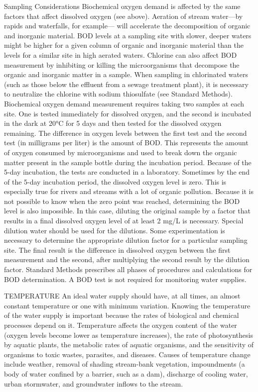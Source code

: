 \documentclass{article}
\begin{document}
Sampling Considerations Biochemical oxygen demand is affected by the
same factors that affect dissolved oxygen (see above). Aeration of
stream water---by rapids and waterfalls, for example--- will accelerate
the decomposition of organic and inorganic material. BOD levels at a
sampling site with slower, deeper waters might be higher for a given
column of organic and inorganic material than the levels for a similar
site in high aerated waters. Chlorine can also affect BOD measurement by
inhibiting or killing the microorganisms that decompose the organic and
inorganic matter in a sample. When sampling in chlorinated waters (such
as those below the effluent from a sewage treatment plant), it is
necessary to neutralize the chlorine with sodium thiosulfate (see
Standard Methods). Biochemical oxygen demand measurement requires taking
two samples at each site. One is tested immediately for dissolved
oxygen, and the second is incubated in the dark at 20°C for 5 days and
then tested for the dissolved oxygen remaining. The difference in oxygen
levels between the first test and the second test (in milligrams per
liter) is the amount of BOD. This represents the amount of oxygen
consumed by microorganisms and used to break down the organic matter
present in the sample bottle during the incubation period. Because of
the 5-day incubation, the tests are conducted in a laboratory. Sometimes
by the end of the 5-day incubation period, the dissolved oxygen level is
zero. This is especially true for rivers and streams with a lot of
organic pollution. Because it is not possible to know when the zero
point was reached, determining the BOD level is also impossible. In this
case, diluting the original sample by a factor that results in a final
dissolved oxygen level of at least 2 mg/L is necessary. Special dilution
water should be used for the dilutions. Some experimentation is
necessary to determine the appropriate dilution factor for a particular
sampling site. The final result is the difference in dissolved oxygen
between the first measurement and the second, after multiplying the
second result by the dilution factor. Standard Methods prescribes all
phases of procedures and calculations for BOD determination. A BOD test
is not required for monitoring water supplies.

TEMPERATURE An ideal water supply should have, at all times, an almost
constant temperature or one with minimum variation. Knowing the
temperature of the water supply is important because the rates of
biological and chemical processes depend on it. Temperature affects the
oxygen content of the water (oxygen levels become lower as temperature
increases), the rate of photosynthesis by aquatic plants, the metabolic
rates of aquatic organisms, and the sensitivity of organisms to toxic
wastes, parasites, and diseases. Causes of temperature change include
weather, removal of shading stream-bank vegetation, impoundments (a body
of water confined by a barrier, such as a dam), discharge of cooling
water, urban stormwater, and groundwater inflows to the stream.
\end{document}
